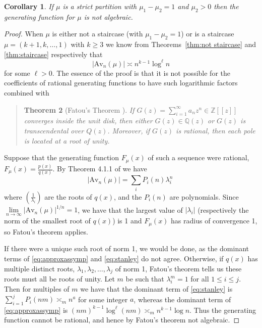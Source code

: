 \documentclass{article}
\theoremstyle{plain}
\newtheorem{theorem}{Theorem}[section]
\newtheorem{corollary}[theorem]{Corollary}
\theoremstyle{definition}
\newcommand{\Av}{\text{Av}}
\begin{document}
\begin{corollary}\label{cor:not rational}
    If $\mu$ is a strict partition with $\mu_1-\mu_2 =1$ and $\mu_2>0$ then the generating function for $\mu$ is not algebraic.  
\end{corollary}
\begin{proof} 
When $\mu$ is either not a staircase (with $\mu_1-\mu_2=1$) or is a staircase $\mu=(k+1,k,\ldots, 1)$ with $k \geq 3$ we know from Theorems~\ref{thm:not staircase} and \ref{thm:staircase} respectively that \begin{equation}|\Av_n(\mu)|\asymp n^{k-1}\log^\ell n \label{eq:approxassymp} \end{equation} for some $\ell>0$. The essence of the proof is that it is not possible for the coefficients of rational generating functions to have such logarithmic factors combined with \begin{quote}
\vspace{-\baselineskip}\begin{theorem}[Fatou's Theorem \cite{fatou}]  If $G(z) = \sum_{i=1}^\infty a_n z^n \in \mathbb{Z}[[z]] $ converges inside the
unit disk, then either $G(z) \in \mathbb{Q}(z)$ or $G(z)$ is transcendental over $Q(z)$. Moreover, if $G(z)$ is rational, then each pole is located at a root of unity.

\end{theorem}
\end{quote}

Suppose that the generating function $F_\mu(x)$ of such a sequence were rational, $F_\mu(x) = \frac{p(x)}{q(x)}$.  By Theorem 4.1.1 of \cite{EC1} we have \begin{equation}|\Av_n(\mu)| = \sum_i P_i(n) \lambda_i^n\ \label{eq:stanley} \end{equation} where $\left(\frac{1}{\lambda_i}\right)$ are the roots of $q(x)$, and the $P_i(n)$ are polynomials.  Since $\lim\limits_{n \to \infty} |\Av_n(\mu)|^{1/n} = 1$, we have that the largest value of $|\lambda_i|$ (respectively the norm of the smallest root of $q(x)$) is 1 and $F_\mu(x)$ has radius of convergence 1, so Fatou's theorem applies.

If there were a unique such root of norm 1, we would be done, as the dominant terms of \eqref{eq:approxassymp} and \eqref{eq:stanley} do not agree.  Otherwise, if $q(x)$ has multiple distinct roots, $\lambda_1,\lambda_2, \ldots, \lambda_j$ of norm 1, Fatou's theorem tells us these roots must all be roots of unity.  Let $m$ be such that $\lambda_i^m=1$ for all $1\leq i \leq j$.  Then for multiples of $m$ we have that the dominant term of \eqref{eq:stanley} is $\sum_{i=1}^j P_i(nm) \asymp_m n^a$ for some integer $a$, whereas the dominant term of \eqref{eq:approxassymp}  is $(nm)^{k-1}\log^\ell (nm) \asymp_m n^{k-1}\log n$.  Thus the generating function cannot be rational, and hence by Fatou's theorem not algebraic.  


\end{proof}
\end{document}
